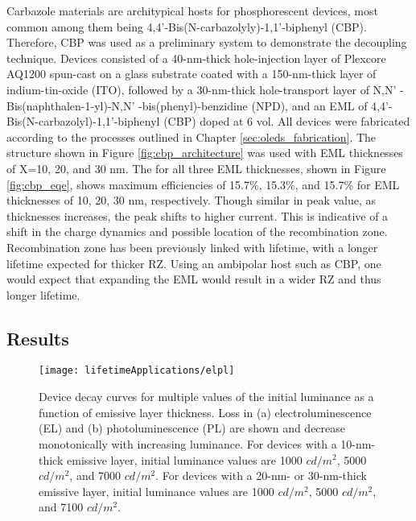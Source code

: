 \documentclass[../thesis.tex]{subfiles}
\begin{document}
Carbazole materials are architypical hosts for phosphorescent devices, most common among them being 4,4'-Bis(N-carbazolyly)-1,1'-biphenyl (CBP).\supercite{Han2014,OBrien1999a,Cho2014,Price2015,Adachi2001,Watanabe2007,Holmes2003,Adamovich2003}
Therefore, CBP was used as a preliminary system to demonstrate the decoupling technique.
Devices consisted of a 40-nm-thick hole-injection layer of Plexcore AQ1200 spun-cast on a glass substrate coated with a 150-nm-thick layer of  indium-tin-oxide (ITO), followed by a 30-nm-thick hole-transport layer of N,N' -Bis(naphthalen-1-yl)-N,N' -bis(phenyl)-benzidine (NPD), and an EML of 4,4'-Bis(N-carbazolyl)-1,1'-biphenyl (CBP) doped at 6 vol. %
All devices were fabricated according to the processes outlined in Chapter \ref{sec:oleds_fabrication}.
The structure shown in Figure \ref{fig:cbp_architecture} was used with EML thicknesses of X=10, 20, and 30 nm.
The \eqe for all three EML thicknesses, shown in Figure \ref{fig:cbp_eqe}, shows maximum efficiencies of 15.7\%, 15.3\%, and 15.7\% for EML thicknesses of 10, 20, 30 nm, respectively.
Though similar in peak value, as thicknesses increases, the peak \eqe shifts to higher current.
This is indicative of a shift in the charge dynamics and possible location of the recombination zone.
Recombination zone has been previously linked with lifetime, with a longer lifetime expected for thicker RZ.\supercite{Zhang2014,Wu2016,Chin2005,Lee2006,Chwang2002,Han2016,Lee2005a,Brown2004,Choong2000,Liu2004}
Using an ambipolar host such as CBP, one would expect that expanding the EML would result in a wider RZ and thus longer lifetime.

\subsection{Results}

\begin{figure}[ht]
\centering
\texttt{[image: lifetimeApplications/elpl]}
\caption{Device decay curves for multiple values of the initial luminance as a function of emissive layer thickness.  Loss in (a) electroluminescence (EL) and (b) photoluminescence (PL) are shown and decrease monotonically with increasing luminance.  For devices with a 10-nm-thick emissive layer, initial luminance values are 1000 $cd/m^2$, 5000 $cd/m^2$, and 7000 $cd/m^2$.  For devices with a 20-nm- or 30-nm-thick emissive layer, initial luminance values are 1000 $cd/m^2$, 5000 $cd/m^2$, and 7100 $cd/m^2$. }
\label{fig:cbp_elpl}
\end{figure}
\end{document}
